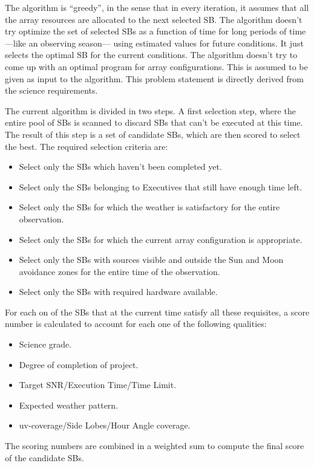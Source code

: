 \documentclass[11pt]{article}
\begin{document}
The algorithm is ``greedy'', in the sense that in every iteration, it assumes that all the array resources are allocated to the next selected SB. The algorithm doesn't try optimize the set of selected SBs as a function of time for long periods of time ---like an observing season--- using estimated values for future conditions. It just selects the optimal SB for the current conditions. The algorithm doesn't try to come up with an optimal program for array configurations. This is assumed to be given as input to the algorithm. This problem statement is directly derived from the science requirements.

The current algorithm is divided in two steps. A first selection step, where the entire pool of SBs is scanned to discard SBs that can't be executed at this time. The result of this step is a set of candidate SBs, which are then scored to select the best. The required selection criteria are:
\begin{itemize}
\item Select only the SBs which haven't been completed yet.
\item Select only the SBs belonging to Executives that still have enough time left.
\item Select only the SBs for which the weather is satisfactory for the entire observation.
\item Select only the SBs for which the current array configuration is appropriate.
\item Select only the SBs with sources visible and outside the Sun and Moon avoidance zones for the entire time of the observation.
\item Select only the SBs with required hardware available.
\end{itemize}

For each on of the SBs that at the current time satisfy all these requisites, a score number is calculated to account for each one of the following qualities:
\begin{itemize}
\item Science grade.
\item Degree of completion of project.
\item Target SNR/Execution Time/Time Limit.
\item Expected weather pattern.
\item uv-coverage/Side Lobes/Hour Angle coverage.
\end{itemize}
The scoring numbers are combined in a weighted sum to compute the final score of the
candidate SBs.
\end{document}
